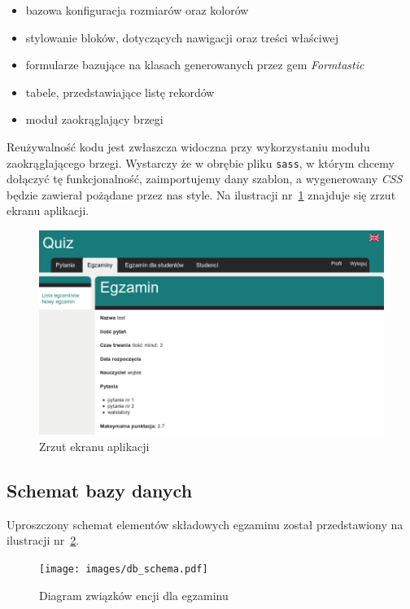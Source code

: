 \documentclass[a4paper,12pt]{article}
\begin{document}
\begin{itemize}
  \item{bazowa konfiguracja rozmiarów oraz kolorów}
  \item{stylowanie bloków, dotyczących nawigacji oraz treści właściwej}
  \item{formularze bazujące na klasach generowanych przez gem \emph{Formtastic}}
  \item{tabele, przedstawiające listę rekordów}
  \item{moduł zaokrąglający brzegi}
\end{itemize}


Reużywalność kodu jest zwłaszcza widoczna przy wykorzystaniu modułu zaokrąglającego
brzegi. Wystarczy że w obrębie pliku \texttt{sass}, w którym chcemy dołączyć tę
funkcjonalność, zaimportujemy dany szablon, a wygenerowany \emph{CSS} będzie zawierał
pożądane przez nas style. Na ilustracji nr~\ref{fig:layout} znajduje się zrzut ekranu
aplikacji.

\begin{figure}[ht]
  \begin{center}
    \includegraphics[width=1\linewidth]{images/layout.png}
  \end{center}
  \caption{Zrzut ekranu aplikacji}
  \label{fig:layout}
\end{figure}

\subsection{Schemat bazy danych}
Uproszczony schemat elementów składowych egzaminu został przedstawiony na ilustracji
nr~\ref{fig:db_schema}.

\begin{figure}[ht]
  \begin{center}
    \texttt{[image: images/db\_schema.pdf]}
  \end{center}
  \caption{Diagram związków encji dla egzaminu}
  \label{fig:db_schema}
\end{figure}
\end{document}
